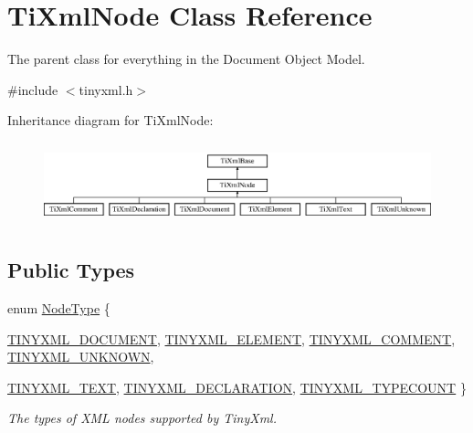 \hypertarget{class_ti_xml_node}{
\section{TiXmlNode Class Reference}
\label{class_ti_xml_node}
}


The parent class for everything in the Document Object Model.  




{\ttfamily \#include $<$tinyxml.h$>$}

Inheritance diagram for TiXmlNode:\begin{figure}[H]
\begin{center}
\leavevmode
\includegraphics[height=2.413793cm]{class_ti_xml_node}
\end{center}
\end{figure}
\subsection*{Public Types}
\begin{DoxyCompactItemize}
\item 
enum \hyperlink{class_ti_xml_node_a836eded4920ab9e9ef28496f48cd95a2}{NodeType} \{ \par
\hyperlink{class_ti_xml_node_a836eded4920ab9e9ef28496f48cd95a2a76c4c520453398cd033e8b97ec9a0b04}{TINYXML\_\-DOCUMENT}, 
\hyperlink{class_ti_xml_node_a836eded4920ab9e9ef28496f48cd95a2a9ad167b17c3148d7a018fde9a41ce976}{TINYXML\_\-ELEMENT}, 
\hyperlink{class_ti_xml_node_a836eded4920ab9e9ef28496f48cd95a2a742eb78855db1e81614848072de03721}{TINYXML\_\-COMMENT}, 
\hyperlink{class_ti_xml_node_a836eded4920ab9e9ef28496f48cd95a2a7376f9420c8ab507842c8a0813bb077e}{TINYXML\_\-UNKNOWN}, 
\par
\hyperlink{class_ti_xml_node_a836eded4920ab9e9ef28496f48cd95a2aa6177e9506461cdca7062559387a2714}{TINYXML\_\-TEXT}, 
\hyperlink{class_ti_xml_node_a836eded4920ab9e9ef28496f48cd95a2a1e2351ad8cd0c805538d94222f3d8cd0}{TINYXML\_\-DECLARATION}, 
\hyperlink{class_ti_xml_node_a836eded4920ab9e9ef28496f48cd95a2a878567737ed539bd3de6a941027e9309}{TINYXML\_\-TYPECOUNT}
 \}
\begin{DoxyCompactList}\small\item\em The types of XML nodes supported by TinyXml. \end{DoxyCompactList}\end{DoxyCompactItemize}
